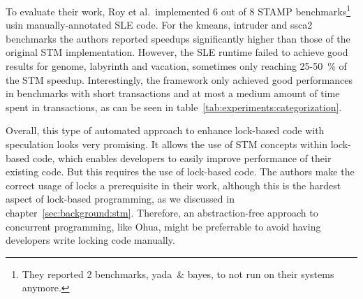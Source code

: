 To evaluate their work, Roy et al.\ implemented 6 out of 8 STAMP benchmarks\footnote{They reported 2 benchmarks, yada~\& bayes, to not run on their systems anymore.} usin manually-annotated SLE code.
For the kmeans, intruder and ssca2 benchmarks the authors reported speedups significantly higher than those of the original STM implementation.
However, the SLE runtime failed to achieve good results for genome, labyrinth and vacation, sometimes only reaching 25-50~\% of the STM speedup.
Interestingly, the framework only achieved good performances in benchmarks with short transactions and at most a medium amount of time spent in transactions, as can be seen in table~\ref{tab:experiments:categorization}.

Overall, this type of automated approach to enhance lock-based code with speculation looks very promising.
It allows the use of STM concepts within lock-based code, which enables developers to easily improve performance of their existing code.
But this requires the use of lock-based code.
The authors make the correct usage of locks a prerequisite in their work, although this is the hardest aspect of lock-based programming, as we discussed in chapter~\ref{sec:background:stm}.
Therefore, an abstraction-free approach to concurrent programming, like Ohua, might be preferrable to avoid having developers write locking code manually.


